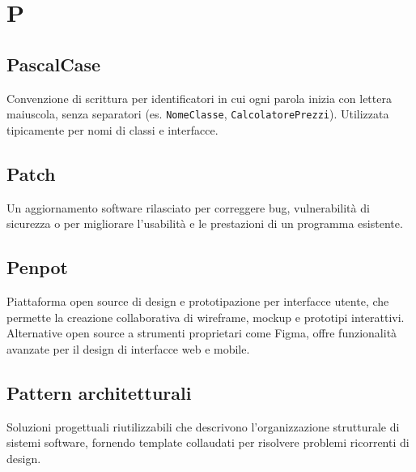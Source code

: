 \documentclass[a4paper, 11pt, oneside]{scrartcl} %
\begin{document}
\vspace{0.5cm}


\section*{P}


\subsection*{PascalCase}
Convenzione di scrittura per identificatori in cui ogni parola inizia con lettera maiuscola, senza separatori (es. \texttt{NomeClasse}, \texttt{CalcolatorePrezzi}). Utilizzata tipicamente per nomi di classi e interfacce.
\vspace{0.5cm}

\subsection*{Patch}
Un aggiornamento software rilasciato per correggere bug, vulnerabilità di sicurezza o per migliorare l'usabilità e le prestazioni di un programma esistente.
\vspace{0.5cm}

\subsection*{Penpot}
Piattaforma open source di design e prototipazione per interfacce utente, che permette la creazione collaborativa di wireframe, mockup e prototipi interattivi. Alternative open source a strumenti proprietari come Figma, offre funzionalità avanzate per il design di interfacce web e mobile.
\vspace{0.5cm}

\subsection*{Pattern architetturali}


Soluzioni progettuali riutilizzabili che descrivono l'organizzazione strutturale di sistemi software, fornendo template collaudati per risolvere problemi ricorrenti di design.
\end{document}
